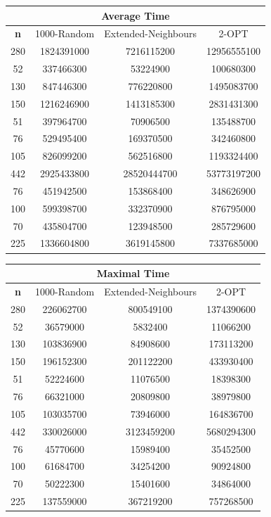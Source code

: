 \documentclass{article}
\begin{document}
\begin{center}
\begin{tabular}{|c|c|c|c|}
\hline
\multicolumn{4}{|c|}{\textbf{Average Time}}\\
\hline
\textbf{n} & 1000-Random & Extended-Neighbours & 2-OPT\\
\hline
280 & 1824391000 & 7216115200 & 12956555100\\
\hline
52 & 337466300 & 53224900 & 100680300\\
\hline
130 & 847446300 & 776220800 & 1495083700\\
\hline
150 & 1216246900 & 1413185300 & 2831431300\\
\hline
51 & 397964700 & 70906500 & 135488700\\
\hline
76 & 529495400 & 169370500 & 342460800\\
\hline
105 & 826099200 & 562516800 & 1193324400\\
\hline
442 & 2925433800 & 28520444700 & 53773197200\\
\hline
76 & 451942500 & 153868400 & 348626900\\
\hline
100 & 599398700 & 332370900 & 876795000\\
\hline
70 & 435804700 & 123948500 & 285729600\\
\hline
225 & 1336604800 & 3619145800 & 7337685000\\
\hline
\end{tabular}
\end{center}

\begin{center}
\begin{tabular}{|c|c|c|c|}
\hline
\multicolumn{4}{|c|}{\textbf{Maximal Time}}\\
\hline
\textbf{n} & 1000-Random & Extended-Neighbours & 2-OPT\\
\hline
280 & 226062700 & 800549100 & 1374390600\\
\hline
52 & 36579000 & 5832400 & 11066200\\
\hline
130 & 103836900 & 84908600 & 173113200\\
\hline
150 & 196152300 & 201122200 & 433930400\\
\hline
51 & 52224600 & 11076500 & 18398300\\
\hline
76 & 66321000 & 20809800 & 38979800\\
\hline
105 & 103035700 & 73946000 & 164836700\\
\hline
442 & 330026000 & 3123459200 & 5680294300\\
\hline
76 & 45770600 & 15989400 & 35452500\\
\hline
100 & 61684700 & 34254200 & 90924800\\
\hline
70 & 50222300 & 15401600 & 34864000\\
\hline
225 & 137559000 & 367219200 & 757268500\\
\hline
\end{tabular}
\end{center}
\end{document}
